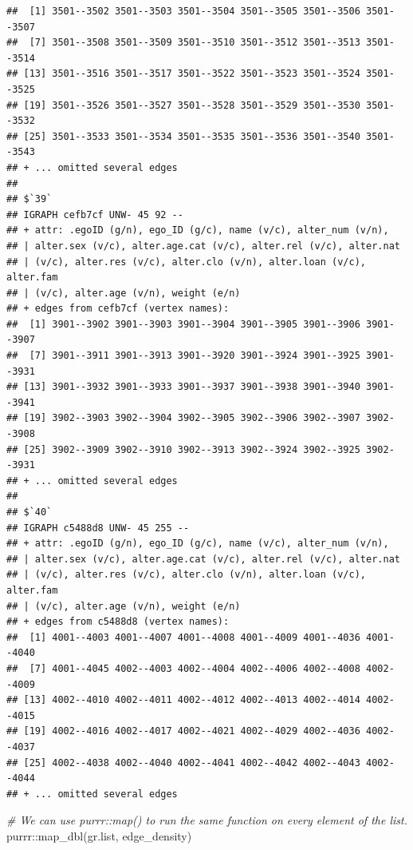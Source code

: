 \documentclass[
]{book}
\newenvironment{Shaded}{\begin{snugshade}}{\end{snugshade}}
\newcommand{\CommentTok}[1]{\textcolor[rgb]{0.56,0.35,0.01}{\textit{#1}}}
\newcommand{\FunctionTok}[1]{\textcolor[rgb]{0.00,0.00,0.00}{#1}}
\newcommand{\NormalTok}[1]{#1}
\newcommand{\SpecialCharTok}[1]{\textcolor[rgb]{0.00,0.00,0.00}{#1}}
\begin{document}
\begin{verbatim}
##  [1] 3501--3502 3501--3503 3501--3504 3501--3505 3501--3506 3501--3507
##  [7] 3501--3508 3501--3509 3501--3510 3501--3512 3501--3513 3501--3514
## [13] 3501--3516 3501--3517 3501--3522 3501--3523 3501--3524 3501--3525
## [19] 3501--3526 3501--3527 3501--3528 3501--3529 3501--3530 3501--3532
## [25] 3501--3533 3501--3534 3501--3535 3501--3536 3501--3540 3501--3543
## + ... omitted several edges
## 
## $`39`
## IGRAPH cefb7cf UNW- 45 92 -- 
## + attr: .egoID (g/n), ego_ID (g/c), name (v/c), alter_num (v/n),
## | alter.sex (v/c), alter.age.cat (v/c), alter.rel (v/c), alter.nat
## | (v/c), alter.res (v/c), alter.clo (v/n), alter.loan (v/c), alter.fam
## | (v/c), alter.age (v/n), weight (e/n)
## + edges from cefb7cf (vertex names):
##  [1] 3901--3902 3901--3903 3901--3904 3901--3905 3901--3906 3901--3907
##  [7] 3901--3911 3901--3913 3901--3920 3901--3924 3901--3925 3901--3931
## [13] 3901--3932 3901--3933 3901--3937 3901--3938 3901--3940 3901--3941
## [19] 3902--3903 3902--3904 3902--3905 3902--3906 3902--3907 3902--3908
## [25] 3902--3909 3902--3910 3902--3913 3902--3924 3902--3925 3902--3931
## + ... omitted several edges
## 
## $`40`
## IGRAPH c5488d8 UNW- 45 255 -- 
## + attr: .egoID (g/n), ego_ID (g/c), name (v/c), alter_num (v/n),
## | alter.sex (v/c), alter.age.cat (v/c), alter.rel (v/c), alter.nat
## | (v/c), alter.res (v/c), alter.clo (v/n), alter.loan (v/c), alter.fam
## | (v/c), alter.age (v/n), weight (e/n)
## + edges from c5488d8 (vertex names):
##  [1] 4001--4003 4001--4007 4001--4008 4001--4009 4001--4036 4001--4040
##  [7] 4001--4045 4002--4003 4002--4004 4002--4006 4002--4008 4002--4009
## [13] 4002--4010 4002--4011 4002--4012 4002--4013 4002--4014 4002--4015
## [19] 4002--4016 4002--4017 4002--4021 4002--4029 4002--4036 4002--4037
## [25] 4002--4038 4002--4040 4002--4041 4002--4042 4002--4043 4002--4044
## + ... omitted several edges
\end{verbatim}

\begin{Shaded}
\begin{Highlighting}[]
\CommentTok{\# We can use purrr::map() to run the same function on every element of the list.}
\NormalTok{purrr}\SpecialCharTok{::}\FunctionTok{map\_dbl}\NormalTok{(gr.list, edge\_density)}
\end{Highlighting}
\end{Shaded}
\end{document}
